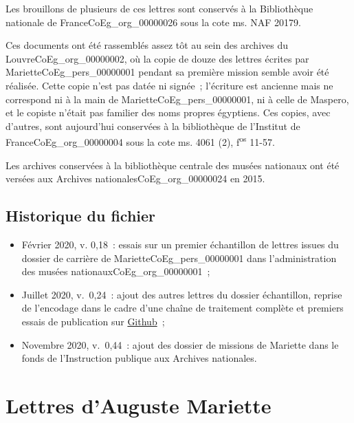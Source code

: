 \documentclass{book}
\begin{document}
\par Les brouillons de plusieurs de ces lettres sont conservés à la Bibliothèque nationale de France\gls{CoEg_org_00000026} sous la cote ms. NAF 20179.
\par Ces documents ont été rassemblés assez tôt au sein des archives du Louvre\gls{CoEg_org_00000002}, où la copie de douze des lettres écrites par Mariette\gls{CoEg_pers_00000001} pendant sa première mission semble avoir été réalisée. Cette copie n'est pas datée ni signée~; l’écriture est ancienne mais ne correspond ni à la main de Mariette\gls{CoEg_pers_00000001}, ni à celle de Maspero, et le copiste n’était pas familier des noms propres égyptiens. Ces copies, avec d’autres, sont aujourd’hui conservées à la bibliothèque de l’Institut de France\gls{CoEg_org_00000004} sous la cote ms. 4061 (2), f\textsuperscript{os} 11-57.
\par Les archives conservées à la bibliothèque centrale des musées nationaux ont été versées aux Archives nationales\gls{CoEg_org_00000024} en 2015.

\section*{Historique du fichier}
\begin{itemize}
\item Février 2020, v. 0,18~: essais sur un premier échantillon de lettres issues du dossier de carrière de Mariette\gls{CoEg_pers_00000001} dans l’administration des musées nationaux\gls{CoEg_org_00000001}~;
\item Juillet 2020, v.~0,24~: ajout des autres lettres du dossier échantillon, reprise de l’encodage dans le cadre d’une chaîne de traitement complète et premiers essais de publication sur \href{https://thlebee.github.io/CoEg/}{Github}~;
\item Novembre 2020, v.~0,44~: ajout des dossier de missions de Mariette dans le fonds de l'Instruction publique aux Archives nationales.
\end{itemize}

\mainmatter

\chapter*{Lettres d’Auguste Mariette}

\hypertarget{CoEg_Mariette_1846-04-13}{}
\end{document}
